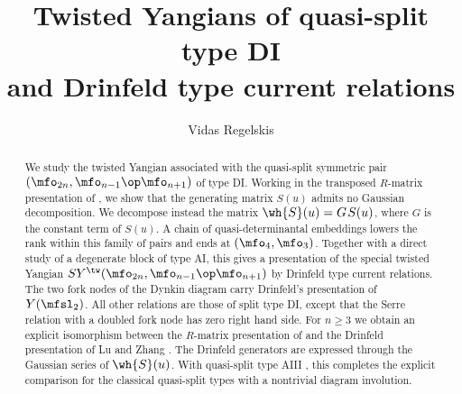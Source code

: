 \documentclass{amsart}
\numberwithin{equation}{section}
\theoremstyle{remark}
\renewcommand{\,}{\kern 0.1em} %
\begin{document}
\title[Twisted Yangians of quasi-split type DI]{Twisted Yangians of quasi-split type DI \\ and Drinfeld type current relations}

\author{Vidas Regelskis}
\address{Department of Physics, Astronomy and Mathematics, University of Hertfordshire,
Hatfield AL10 9AB, UK and
Institute of Theoretical Physics and Astronomy, Vilnius University, Saul\.etekio av.~3, Vilnius 10257, Lithuania.}



\begin{abstract}
We study the twisted Yangian associated with the quasi-split symmetric pair $(\mfo_{2n}, \mfo_{n-1}\op\mfo_{n+1})$ of type DI. Working in the transposed $R$-matrix presentation of \cite{Re26}, we show that the generating matrix $S(u)$ admits no Gaussian decomposition. We decompose instead the matrix $\wh{S}(u) = G\,S(u)$, where $G$ is the constant term of $S(u)$. A chain of quasi-determinantal embeddings lowers the rank within this family of pairs and ends at $(\mfo_4,\mfo_3)$. Together with a direct study of a degenerate block of type AI, this gives a presentation of the special twisted Yangian $SY^\tw(\mfo_{2n},\mfo_{n-1}\op\mfo_{n+1})$ by Drinfeld type current relations. The two fork nodes of the Dynkin diagram carry Drinfeld's presentation of $Y(\mfsl_2)$. All other relations are those of split type DI, except that the Serre relation with a doubled fork node has zero right hand side. For $n\ge3$ we obtain an explicit isomorphism between the $R$-matrix presentation of \cite{GR16} and the Drinfeld presentation of Lu and Zhang \cite{LZ25}. The Drinfeld generators are expressed through the Gaussian series of $\wh{S}(u)$. With quasi-split type AIII \cite{LZ25}, this completes the explicit comparison for the classical quasi-split types with a nontrivial diagram involution.
\end{abstract}


\maketitle
\setcounter{tocdepth}{1}
\tableofcontents
\setcounter{tocdepth}{2}

\setlength{\medmuskip}{2.0mu plus 1.0mu minus 1.0mu}


\end{document}
